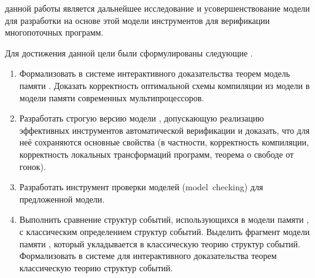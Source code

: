 


{\aim} данной работы является дальнейшее исследование и
усовершенствование модели \Wkm для разработки
на основе этой модели инструментов для верификации многопоточных программ. 

Для достижения данной цели были сформулированы следующие {\tasks}.
\begin{enumerate}[beginpenalty=10000] %
  \item
    Формализовать в системе интерактивного доказательства теорем \coq модель памяти \Wkm.
    Доказать корректность оптимальной схемы компиляции
    из модели \Wkm в модели памяти современных мультипроцессоров.
  \item
    Разработать строгую версию модели \Wkm, 
    допускающую реализацию эффективных инструментов автоматической верификации
    и доказать, что для неё сохраняются основные свойства \Wkm  
    (в частности, корректность компиляции, корректность локальных трансформаций программ, 
     теорема о свободе от гонок).
  \item
    Разработать инструмент проверки моделей (model~checking) для предложенной модели.
  \item
    Выполнить сравнение структур событий, использующихся в модели памяти \Wkm,
    с классическим определением структур событий.
    Выделить фрагмент модели памяти \Wkm, который укладывается
    в классическую теорию структур событий.
    Формализовать в системе для интерактивного доказательства теорем \coq
    классическую теорию структур событий. 
\end{enumerate}

